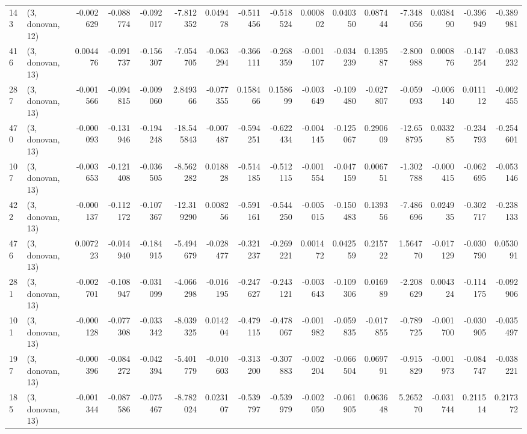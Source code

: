 \begin{tabular}{llrrrrrrrrrrrrrr}
143 &  (3, donovan, 12) &  -0.002629 & -0.088774 & -0.092017 &    -7.812352 &   0.049478 &  -0.511456 &  -0.518524 &  0.000802 &  0.040350 &  0.087444 &   -7.348056 &  0.038490 & -0.396949 & -0.389981 \\
416 &  (3, donovan, 13) &   0.004476 & -0.091737 & -0.156307 &    -7.054705 &  -0.063294 &  -0.366111 &  -0.268359 & -0.001107 & -0.034239 &  0.139587 &   -2.800988 &  0.000876 & -0.147254 & -0.083232 \\
287 &  (3, donovan, 13) &  -0.001566 & -0.094815 & -0.009060 &     2.849366 &  -0.077355 &   0.158466 &   0.158699 & -0.003649 & -0.109480 & -0.027807 &   -0.059093 & -0.006140 &  0.011112 & -0.002455 \\
470 &  (3, donovan, 13) &  -0.000093 & -0.131946 & -0.194248 &   -18.545843 &  -0.007487 &  -0.594251 &  -0.622434 & -0.004145 & -0.125067 &  0.290609 &  -12.658795 &  0.033285 & -0.234793 & -0.254601 \\
107 &  (3, donovan, 13) &  -0.003653 & -0.121408 & -0.036505 &    -8.562282 &   0.018828 &  -0.514185 &  -0.512115 & -0.001554 & -0.047159 &  0.006751 &   -1.302788 & -0.000415 & -0.062695 & -0.053146 \\
422 &  (3, donovan, 13) &  -0.000137 & -0.112172 & -0.107367 &   -12.319290 &   0.008256 &  -0.591161 &  -0.544250 & -0.005015 & -0.150483 &  0.139356 &   -7.486696 &  0.024935 & -0.302717 & -0.238133 \\
476 &  (3, donovan, 13) &   0.007223 & -0.014940 & -0.184915 &    -5.494679 &  -0.028477 &  -0.321237 &  -0.269221 &  0.001472 &  0.042559 &  0.215722 &    1.564770 & -0.017129 & -0.030790 &  0.053091 \\
281 &  (3, donovan, 13) &  -0.002701 & -0.108947 & -0.031099 &    -4.066298 &  -0.016195 &  -0.247627 &  -0.243121 & -0.003643 & -0.109306 &  0.016989 &   -2.208629 &  0.004324 & -0.114175 & -0.092906 \\
101 &  (3, donovan, 13) &  -0.000128 & -0.077308 & -0.033342 &    -8.039325 &   0.014204 &  -0.479115 &  -0.478067 & -0.001982 & -0.059835 & -0.017855 &   -0.789725 & -0.001700 & -0.030905 & -0.035497 \\
197 &  (3, donovan, 13) &  -0.000396 & -0.084272 & -0.042394 &    -5.401779 &  -0.010603 &  -0.313200 &  -0.307883 & -0.002204 & -0.066504 &  0.069791 &   -0.915829 & -0.001973 & -0.084747 & -0.038221 \\
185 &  (3, donovan, 13) &  -0.001344 & -0.087586 & -0.075467 &    -8.782024 &   0.023107 &  -0.539797 &  -0.539979 & -0.002050 & -0.061905 &  0.063648 &    5.265270 & -0.031744 &  0.211514 &  0.217372 \\

\end{tabular}
